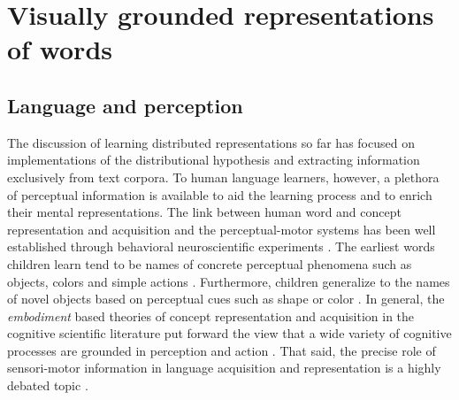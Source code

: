 



\section{Visually grounded representations of words}
\label{sec:visualwords}

\subsection{Language and perception}
\label{sec:langperc}

The discussion of learning distributed representations so far has focused on
implementations of the distributional hypothesis and extracting information exclusively
from text corpora. To human language learners, however, a plethora of
perceptual information is available to aid the
learning process and to enrich their mental representations.
The link between human word and concept representation
and acquisition and the perceptual-motor systems has been well established through behavioral
neuroscientific experiments \citep{pulvermuller2005brain}.
The earliest words children learn tend to be names of concrete perceptual phenomena
such as objects, colors and simple actions \citep{bornstein2004cross}. Furthermore, children generalize to
the names of novel objects based on perceptual cues such as shape or color \citep{landau1998object}.
In general, the \emph{embodiment} based theories of concept representation and acquisition in the
cognitive scientific literature put forward the view that a wide variety of cognitive processes
are grounded in perception and action \citep{meteyard2008role}. That said, the precise role of
sensori-motor information in language acquisition and representation is a highly
debated topic \citep{meteyard2012coming}.

